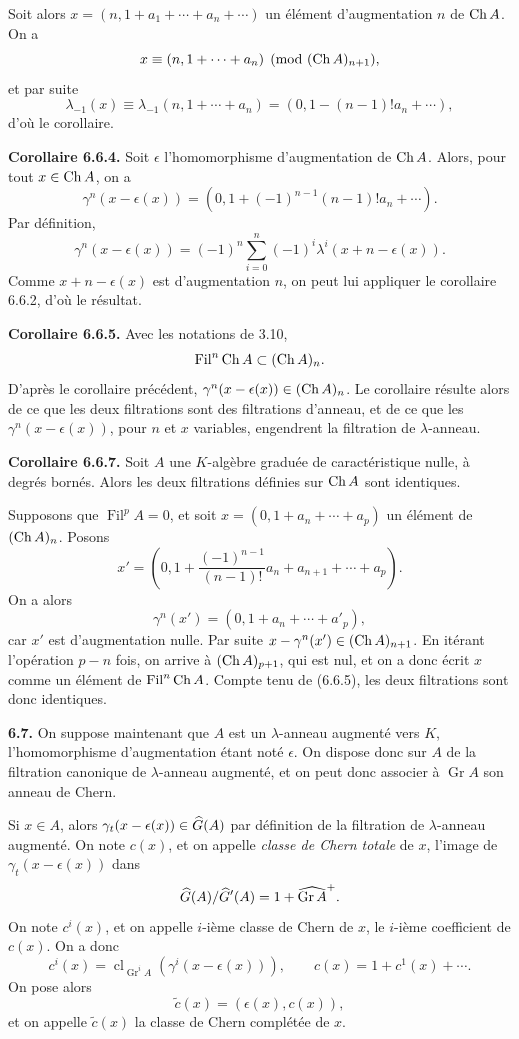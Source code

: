 \documentclass[11pt]{article}
\newcommand{\Gr}{\operatorname{Gr}}
\newcommand{\Fil}{\operatorname{Fil}}
\newcommand{\cl}{\operatorname{cl}}
\providecommand{\Gr}{\operatorname{Gr}}
\providecommand{\Gr}{\operatorname{G}}
\begin{document}
Soit alors \(x=(n,1+a_1+\cdots+a_n+\cdots)\) un élément d'augmentation \(n\) de \(\operatorname{Ch} A\). On a
\[
  x\equiv (n,1+\cdots+a_n)\pmod{(\operatorname{Ch} A)_{n+1}},
\]
et par suite
\[
  \lambda_{-1}(x)\equiv\lambda_{-1}(n,1+\cdots+a_n)
  =(0,1-(n-1)!a_n+\cdots),
\]
d'où le corollaire.

\textbf{Corollaire 6.6.4.} Soit \(\epsilon\) l'homomorphisme d'augmentation de \(\operatorname{Ch} A\). Alors, pour tout \(x\in\operatorname{Ch} A\), on a
\[
  \gamma^n(x-\epsilon(x))
  =
  (0,1+(-1)^{n-1}(n-1)!a_n+\cdots).
\]
Par définition,
\[
  \gamma^n(x-\epsilon(x))
  =
  (-1)^n\sum_{i=0}^n(-1)^i\lambda^i(x+n-\epsilon(x)).
\]
Comme \(x+n-\epsilon(x)\) est d'augmentation \(n\), on peut lui appliquer le corollaire 6.6.2, d'où le résultat.

\textbf{Corollaire 6.6.5.} Avec les notations de 3.10,
\[
  \Fil^n\Ch A\subset(\Ch A)_n.
\]
D'après le corollaire précédent, \(\gamma^n(x-\epsilon(x))\in(\operatorname{Ch} A)_n\). Le corollaire résulte alors de ce que les deux filtrations sont des filtrations d'anneau, et de ce que les \(\gamma^n(x-\epsilon(x))\), pour \(n\) et \(x\) variables, engendrent la filtration de \(\lambda\)-anneau.

\textbf{Corollaire 6.6.7.} Soit \(A\) une \(K\)-algèbre graduée de caractéristique nulle, à degrés bornés. Alors les deux filtrations définies sur \(\operatorname{Ch} A\) sont identiques.

Supposons que \(\Fil^pA=0\), et soit \(x=(0,1+a_n+\cdots+a_p)\) un élément de \((\operatorname{Ch} A)_n\). Posons
\[
  x'=\left(0,1+\frac{(-1)^{n-1}}{(n-1)!}a_n+a_{n+1}+\cdots+a_p\right).
\]
On a alors
\[
  \gamma^n(x')=(0,1+a_n+\cdots+a'_p),
\]
car \(x'\) est d'augmentation nulle. Par suite \(x-\gamma^n(x')\in(\operatorname{Ch} A)_{n+1}\). En itérant l'opération \(p-n\) fois, on arrive à \((\operatorname{Ch} A)_{p+1}\), qui est nul, et on a donc écrit \(x\) comme un élément de \(\Fil^n\Ch A\). Compte tenu de (6.6.5), les deux filtrations sont donc identiques.

\textbf{6.7.} On suppose maintenant que \(A\) est un \(\lambda\)-anneau augmenté vers \(K\), l'homomorphisme d'augmentation étant noté \(\epsilon\). On dispose donc sur \(A\) de la filtration canonique de \(\lambda\)-anneau augmenté, et on peut donc associer à \(\Gr A\) son anneau de Chern.

Si \(x\in A\), alors \(\gamma_t(x-\epsilon(x))\in\widehat G(A)\) par définition de la filtration de \(\lambda\)-anneau augmenté. On note \(c(x)\), et on appelle \emph{classe de Chern totale} de \(x\), l'image de \(\gamma_t(x-\epsilon(x))\) dans
\[
  \Ghat(A)/\Ghat'(A)=1+\widehat{\Gr A}^{+}.
\]
On note \(c^i(x)\), et on appelle \(i\)-ième classe de Chern de \(x\), le \(i\)-ième coefficient de \(c(x)\). On a donc
\begin{equation}\tag{6.7.1}
  c^i(x)=\cl_{\Gr^iA}\!\left(\gamma^i(x-\epsilon(x))\right),
  \qquad
  c(x)=1+c^1(x)+\cdots .
\end{equation}
On pose alors
\begin{equation}\tag{6.7.2}
  \widetilde c(x)=(\epsilon(x),c(x)),
\end{equation}
et on appelle \(\widetilde c(x)\) la classe de Chern complétée de \(x\).
\end{document}
